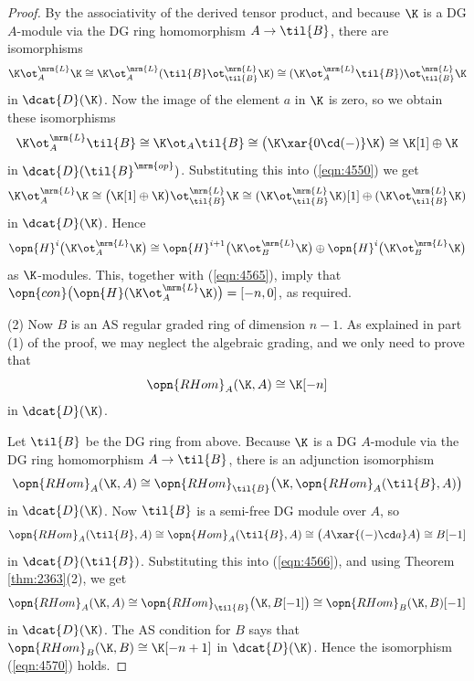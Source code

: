 \begin{proof}
By the associativity of the derived tensor product, and because $\K$ is a DG 
$A$-module via the DG ring homomorphism 
$A \to \til{B}$, there are isomorphisms
\begin{equation} \label{eqn:4550}
\K \ot^{\mrm{L}}_{A} \K \cong
\K \ot^{\mrm{L}}_{A} (\til{B} \ot^{\mrm{L}}_{\til{B}} \K) \cong
(\K \ot^{\mrm{L}}_{A} \til{B}) \ot^{\mrm{L}}_{\til{B}} \K
\end{equation}
in $\dcat{D}(\K)$. 
Now the image of the element $a$ in $\K$ is zero, so we obtain these 
isomorphisms
\[ \K \ot^{\mrm{L}}_{A} \til{B} \cong \K \ot_{A} \til{B} \cong 
\bigl( \K \xar{0 \cd (-)} \K \bigr) \cong \K[1] \oplus \K \]
in $\dcat{D}(\til{B}^{\mrm{op}})$.
Substituting this into (\ref{eqn:4550}) we get 
\[ \K \ot^{\mrm{L}}_{A} \K \cong 
\bigl( \K[1] \oplus \K \bigr) \ot^{\mrm{L}}_{\til{B}} \K
\cong (\K \ot^{\mrm{L}}_{\til{B}} \K)[1] \oplus 
(\K \ot^{\mrm{L}}_{\til{B}} \K) \]
in $\dcat{D}(\K)$. 
Hence 
\begin{equation} \label{eqn:4551}
\opn{H}^i \bigl( \K \ot^{\mrm{L}}_{A} \K \bigr) \cong 
\opn{H}^{i + 1} \bigl( \K \ot^{\mrm{L}}_{B} \K \bigr) \oplus 
\opn{H}^{i} \bigl( \K \ot^{\mrm{L}}_{B} \K \bigr) 
\end{equation}
as $\K$-modules. This, together with (\ref{eqn:4565}), imply that 
$\opn{con} \bigl( \opn{H}(\K \ot^{\mrm{L}}_{A} \K) \bigr) = [-n, 0]$,
as required. 

\medskip \noindent
(2) Now $B$ is an AS regular graded ring of dimension $n - 1$.
As explained in part (1) of the proof, we may neglect the algebraic grading, 
and we only need to prove that 
\begin{equation} \label{eqn:4570}
\opn{RHom}_{A}(\K, A) \cong \K[-n]
\end{equation}
in $\dcat{D}(\K)$.

Let $\til{B}$ be the DG ring from above. Because $\K$ is a DG $A$-module via 
the DG ring homomorphism $A \to \til{B}$, there is an adjunction isomorphism
\begin{equation} \label{eqn:4566} 
\opn{RHom}_{A}(\K, A) \cong 
\opn{RHom}_{\til{B}} \bigl( \K, \opn{RHom}_{A}(\til{B}, A) \bigr) 
\end{equation}
in $\dcat{D}(\K)$. 
Now $\til{B}$ is a semi-free DG module over $A$, so 
\[ \opn{RHom}_{A}(\til{B}, A) \cong 
\opn{Hom}_{A}(\til{B}, A) \cong 
\bigl( A \xar{(-) \cd a} A \bigr) \cong B[-1] \]
in $\dcat{D}(\til{B})$. Substituting this into (\ref{eqn:4566}), and using 
Theorem \ref{thm:2363}(2), we get 
\[ \opn{RHom}_{A}(\K, A) \cong 
\opn{RHom}_{\til{B}} \bigl( \K, B[-1] \bigr) 
\cong \opn{RHom}_{B}(\K, B)[-1] \]
in $\dcat{D}(\K)$.
The AS condition for $B$ says that 
$\opn{RHom}_{B}(\K, B) \cong \K[-n + 1]$ 
in $\dcat{D}(\K)$. Hence the isomorphism (\ref{eqn:4570}) holds. 
\end{proof}

